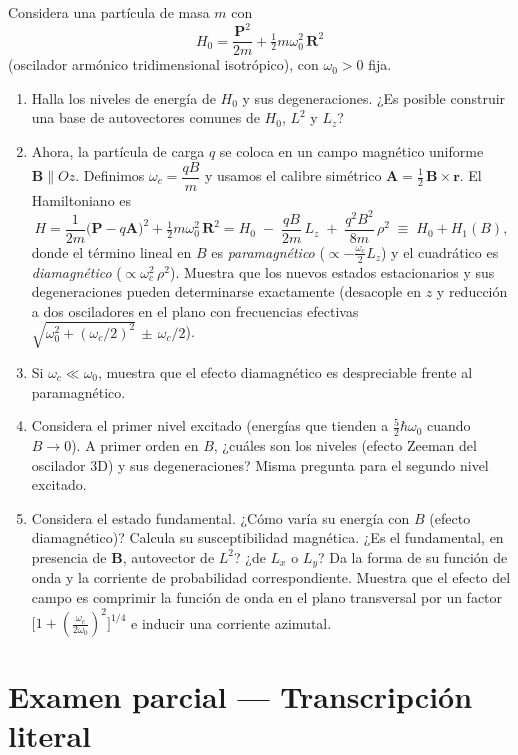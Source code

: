 \documentclass[a4paper,11pt]{article}
\begin{document}
Considera una partícula de masa $m$ con
\[
H_0=\frac{\mathbf{P}^2}{2m}+\tfrac12 m\omega_0^2\,\mathbf{R}^2
\]
(oscilador armónico tridimensional isotrópico), con $\omega_0>0$ fija.
\begin{enumerate}
	\item Halla los niveles de energía de $H_0$ y sus degeneraciones. ¿Es posible construir una base de autovectores comunes de $H_0$, $L^2$ y $L_z$?
	\item Ahora, la partícula de carga $q$ se coloca en un campo magnético uniforme $\mathbf{B}\parallel Oz$. Definimos $\omega_c=\dfrac{qB}{m}$ y usamos el calibre simétrico $\mathbf{A}=\tfrac12\,\mathbf{B}\times\mathbf{r}$. El Hamiltoniano es
	\[
	H=\frac{1}{2m}\big(\mathbf{P}-q\mathbf{A}\big)^2+\tfrac12 m\omega_0^2\,\mathbf{R}^2
	= H_0\; -\;\frac{qB}{2m}\,L_z\; +\;\frac{q^2B^2}{8m}\,\rho^2\;\equiv\;H_0+H_1(B),
	\]
	donde el término lineal en $B$ es \emph{paramagnético} ($\propto -\tfrac{\omega_c}{2}L_z$) y el cuadrático es \emph{diamagnético} ($\propto \omega_c^2\,\rho^2$). Muestra que los nuevos estados estacionarios y sus degeneraciones pueden determinarse exactamente (desacople en $z$ y reducción a dos osciladores en el plano con frecuencias efectivas $\sqrt{\omega_0^2+(\omega_c/2)^2}\,\pm\,\omega_c/2$).
	\item Si $\omega_c\ll\omega_0$, muestra que el efecto diamagnético es despreciable frente al paramagnético.
	\item Considera el primer nivel excitado (energías que tienden a $\tfrac{5}{2}\hbar\omega_0$ cuando $B\to 0$). A primer orden en $B$, ¿cuáles son los niveles (efecto Zeeman del oscilador 3D) y sus degeneraciones? Misma pregunta para el segundo nivel excitado.
	\item Considera el estado fundamental. ¿Cómo varía su energía con $B$ (efecto diamagnético)? Calcula su susceptibilidad magnética. ¿Es el fundamental, en presencia de $\mathbf{B}$, autovector de $L^2$? ¿de $L_x$ o $L_y$? Da la forma de su función de onda y la corriente de probabilidad correspondiente. Muestra que el efecto del campo es comprimir la función de onda en el plano transversal por un factor $\big[1+(\tfrac{\omega_c}{2\omega_0})^2\big]^{1/4}$ e inducir una corriente azimutal.
\end{enumerate}

\section*{Examen parcial — Transcripción literal}
\end{document}
